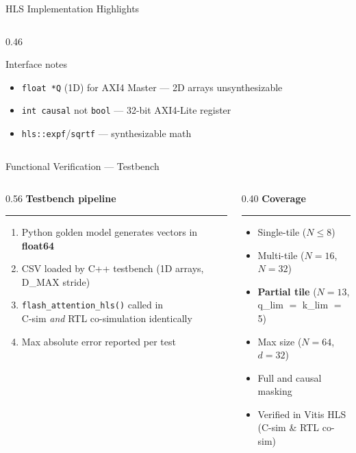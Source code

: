 \documentclass[aspectratio=169, 10pt]{beamer}
\newcommand{\hl}[1]{{\color{Blue}\textbf{#1}}}
\newcommand{\hrulefull}{%
  \par\vspace{1pt}%
  {\color{SlateGry!40}\rule{\linewidth}{0.4pt}}%
  \par\vspace{2pt}%
}
\begin{document}
\begin{frame}[fragile]{HLS Implementation Highlights}
\begin{columns}[T]
\begin{column}{0.46\textwidth}
      \vspace{0.15cm}
      \begin{block}{Interface notes}
        \vspace{2pt}
        \begin{itemize}\setlength\itemsep{1pt}
          \item \texttt{float *Q} (1D) for AXI4 Master — 2D arrays unsynthesizable
          \item \texttt{int causal} not \texttt{bool} — 32-bit AXI4-Lite register
          \item \texttt{hls::expf}/\texttt{sqrtf} — synthesizable math
        \end{itemize}
        \vspace{2pt}
      \end{block}
    \end{column}
  \end{columns}
\end{frame}

\begin{frame}{Functional Verification --- Testbench}
  \begin{columns}[T]
    \begin{column}{0.56\textwidth}
      \textbf{Testbench pipeline}
      \hrulefull
      \begin{enumerate}\setlength\itemsep{3pt}
        \item Python golden model generates vectors in \textbf{float64}
        \item CSV loaded by C++ testbench (1D arrays, D\_MAX stride)
        \item \texttt{flash\_attention\_hls()} called in\\
              C-sim \emph{and} RTL co-simulation identically
        \item Max absolute error reported per test
      \end{enumerate}
    \end{column}
    \begin{column}{0.40\textwidth}
      \textbf{Coverage}
      \hrulefull
      \begin{itemize}\setlength\itemsep{3pt}
        \item Single-tile ($N \le 8$)
        \item Multi-tile ($N{=}16$, $N{=}32$)
        \item \hl{Partial tile} ($N{=}13$,\\
              q\_lim $=$ k\_lim $=$ 5)
        \item Max size ($N{=}64$, $d{=}32$)
        \item Full and causal masking
        \item Verified in Vitis HLS\\(C-sim \& RTL co-sim)
      \end{itemize}
    \end{column}
  \end{columns}
\end{frame}
\end{document}
